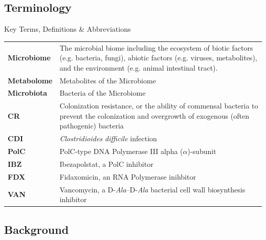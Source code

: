 \subsection{Terminology}
\begin{frame}{Key Terms, Definitions \& Abbreviations} 
    \centering \hspace*{-1.5cm} 
    \begin{minipage}{0.95\textwidth}
        \begin{tabularx}{\textwidth}{>{\bf}l >{\footnotesize}X}
            Microbiome & The microbial biome including the ecosystem of biotic factors (e.g. bacteria, fungi), abiotic factors (e.g. viruses, metabolites), and the environment (e.g. animal intestinal tract).  \\
            Metabolome & Metabolites of the Microbiome \\
            Microbiota & Bacteria of the Microbiome \\
            CR & Colonization resistance, or the ability of commensal bacteria to prevent the colonization and overgrowth of exogenous (often pathogenic) bacteria \\
            CDI & \textit{Clostridioides difficile} infection \\
            PolC & PolC-type DNA Polymerase III alpha ($\alpha$)-subunit \\
            IBZ & Ibezapolstat, a PolC inhibitor \\
            FDX & Fidaxomicin, an RNA Polymerase inihbitor \\
            VAN & Vancomycin, a $\mathrm{D}$-\textit{Ala}--$\mathrm{D}$-\textit{Ala} bacterial cell wall biosynthesis inhibitor \\
        \end{tabularx} \tiny %
    \end{minipage}
\end{frame}


\subsection{Background}




